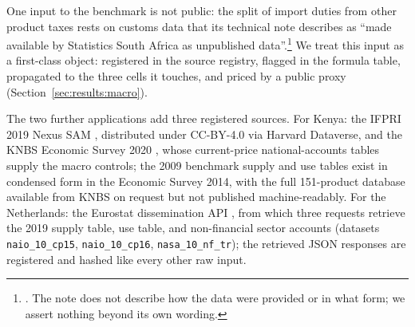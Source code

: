 One input to the benchmark is not public: the split of import duties from
other product taxes rests on customs data that its technical note describes
as ``made available by Statistics South Africa as unpublished
data''.\footnote{\citet[item vii]{vanseventer2023}. The note does not
describe how the data were provided or in what form; we assert nothing
beyond its own wording.} We treat this input as a first-class object:
registered in the source registry, flagged in the formula table, propagated
to the three cells it touches, and priced by a public proxy
(Section~\ref{sec:results:macro}).

The two further applications add three registered sources. For Kenya: the
IFPRI 2019 Nexus SAM \citep{thurlow2021}, distributed under CC-BY-4.0 via
Harvard Dataverse, and the KNBS Economic Survey 2020
\citep{knbs2020}, whose current-price national-accounts tables supply the
macro controls; the 2009 benchmark supply and use tables exist in
condensed form in the Economic Survey 2014, with the full 151-product
database available from KNBS on request but not published
machine-readably. For the Netherlands: the Eurostat dissemination API
\citep{eurostat2024}, from which three requests retrieve the 2019 supply
table, use table, and non-financial sector accounts (datasets
\texttt{naio\_10\_cp15}, \texttt{naio\_10\_cp16},
\texttt{nasa\_10\_nf\_tr}); the retrieved JSON responses are registered
and hashed like every other raw input.
